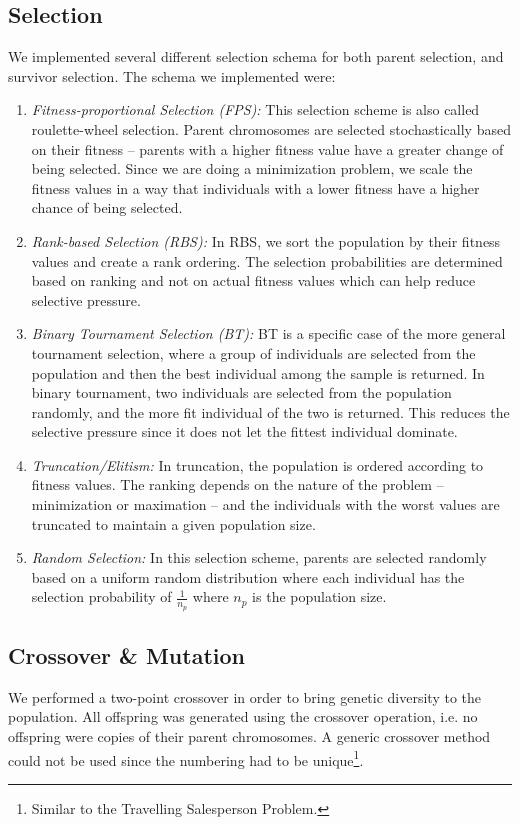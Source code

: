 \documentclass[conference,compsoc]{IEEEtran}
\begin{document}
\subsection{Selection}
We implemented several different selection schema for both parent selection, and 
survivor selection. The schema we implemented were:
\begin{enumerate}
  \item \textit{Fitness-proportional Selection (FPS):} This selection scheme 
  is also called roulette-wheel selection. Parent chromosomes are selected stochastically based on 
  their fitness -- parents with a higher fitness value have a greater change of being selected. 
  Since we are doing a minimization problem, we scale the fitness values in a way that individuals with a 
  lower fitness have a higher chance of being selected.  
  \item \textit{Rank-based Selection (RBS):} In RBS, we sort the population by their fitness values and 
  create a rank ordering. The selection probabilities are determined based on ranking and not on actual 
  fitness values which can help reduce selective pressure. 
  \item \textit{Binary Tournament Selection (BT):} BT is a specific case of the more general tournament selection, 
  where a group of individuals are selected from the population and then the best individual among the sample is returned. 
  In binary tournament, two individuals are selected from the population randomly, and the more fit individual of the two 
  is returned. This reduces the selective pressure since it does not let the fittest individual dominate. 
  \item \textit{Truncation/Elitism:} In truncation, the population is ordered according to fitness values. The ranking 
  depends on the nature of the problem -- minimization or maximation -- and the individuals with the worst values 
  are truncated to maintain a given population size. 
  \item \textit{Random Selection:} In this selection scheme, parents are selected randomly 
  based on a uniform random distribution where each individual has the selection probability of 
  $\frac{1}{n_p}$ where $n_p$ is the population size. 
\end{enumerate}


\subsection{Crossover \& Mutation}
We performed a two-point crossover in order to bring genetic diversity to the 
population. All offspring was generated using the crossover operation, i.e. no offspring 
were copies of their parent chromosomes. A generic crossover 
method could not be used since the numbering had to be unique\footnote{Similar to the Travelling Salesperson Problem.}.
\end{document}
